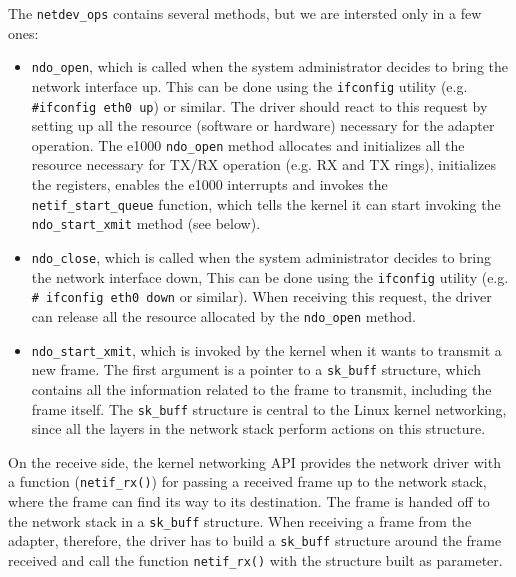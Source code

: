 The \texttt{netdev\_ops} contains several methods, but we are intersted only in a few ones:
\begin{itemize}
    \item \texttt{ndo\_open}, which is called when the system administrator decides to bring the network interface up. This can be done
	  using the \texttt{ifconfig} utility (e.g. \texttt{\#ifconfig eth0 up}) or similar. The driver should react to this request by
	  setting up all the resource (software or hardware) necessary for the adapter operation. The e1000 \texttt{ndo\_open} method
	  allocates and initializes all the resource necessary for TX/RX operation (e.g. RX and TX rings), initializes the registers,
	  enables the e1000 interrupts and invokes the \texttt{netif\_start\_queue} function, which tells the kernel it can start invoking
	  the \texttt{ndo\_start\_xmit} method (see below).
	  
    \item \texttt{ndo\_close}, which is called when the system administrator decides to bring the network interface down, This can be
	  done using the \texttt{ifconfig} utility (e.g. \texttt{\# ifconfig eth0 down} or similar). When receiving this request,
	  the driver can release all the resource allocated by the \texttt{ndo\_open} method.
	  
    \item \texttt{ndo\_start\_xmit}, which is invoked by the kernel when it wants to transmit a new frame. The first argument is
	  a pointer to a \texttt{sk\_buff} structure, which contains all the information related to the frame to transmit, including
	  the frame itself. The \texttt{sk\_buff} structure is central to the Linux kernel networking, since all the layers in the 
	  network stack perform actions on this structure.
	 
\end{itemize}

On the receive side, the kernel networking API provides the network driver with a function (\texttt{netif\_rx()}) for passing a
received frame up to the network stack, where the frame can find its way to its destination.
The frame is handed off to the network stack in a \texttt{sk\_buff} structure.
When receiving a frame from the adapter, therefore, the driver has to build a \texttt{sk\_buff} structure around the frame received
and call the function \texttt{netif\_rx()} with the structure built as parameter.


